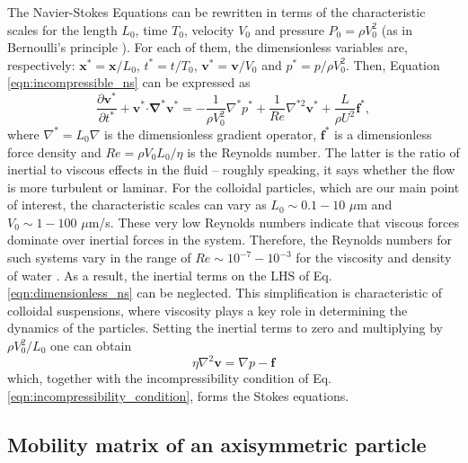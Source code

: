 \documentclass{master_thesis}
\begin{document}
The Navier-Stokes Equations can be rewritten in terms of the characteristic scales for the length $L_0$, time $T_0$, velocity $V_0$ and pressure $P_0=\rho V_0^2$ (as in Bernoulli's principle \cite{batchelor_2000}). For each of them, the dimensionless variables are, respectively: $\boldsymbol{x}^*=\boldsymbol{x}/L_0$, $t^*=t/T_0$, $\boldsymbol{v}^*=\boldsymbol{v}/V_0$ and $p^*=p/\rho V_0^2$. Then, Equation \eqref{eqn:incompressible_ns} can be expressed as
\begin{equation}
    \frac{\partial \boldsymbol{v}^*}{\partial t^*} 
    + \boldsymbol{v}^*\boldsymbol{\cdot\nabla}^*\boldsymbol{v}^* 
    = -\frac{1}{\rho V_0^2}\nabla^*p^* 
    + \frac{1}{Re}\nabla^{*2}\boldsymbol{v}^* 
    + \frac{L}{\rho U^2}\boldsymbol{f}^*,
\label{eqn:dimensionless_ns}
\end{equation}
where $\nabla^*=L_0\nabla$ is the dimensionless gradient operator, $\boldsymbol{f}^*$ is a dimensionless force density and $Re=\rho V_0 L_0 / \eta$ is the Reynolds number. The latter is the ratio of inertial to viscous effects in the fluid -- roughly speaking, it says whether the flow is more turbulent or laminar. For the colloidal particles, which are our main point of interest, the characteristic scales can vary as $L_0\sim0.1 - 10$ $\mu$m and $V_0\sim1 - 100$ $\mu$m/s. These very low Reynolds numbers indicate that viscous forces dominate over inertial forces in the system. Therefore, the Reynolds numbers for such systems vary in the range of $Re \sim 10^{-7}-10^{-3}$ for the viscosity and density of water \cite{klumpp_2019}. As a result, the inertial terms on the LHS of Eq. \eqref{eqn:dimensionless_ns} can be neglected. This simplification is characteristic of colloidal suspensions, where viscosity plays a key role in determining the dynamics of the particles. Setting the inertial terms to zero and multiplying by $\rho V_0^2/L_0$ one can obtain
\begin{equation}
    \eta \nabla^2 \boldsymbol{v} = \nabla p - \boldsymbol{f}
\label{eqn:stokes_equation}
\end{equation}
which, together with the incompressibility condition of Eq. \eqref{eqn:incompressibility_condition}, forms the Stokes equations.

\subsection{Mobility matrix of an axisymmetric particle} \label{sec:axisymmetric_mobility_theory}
\end{document}
